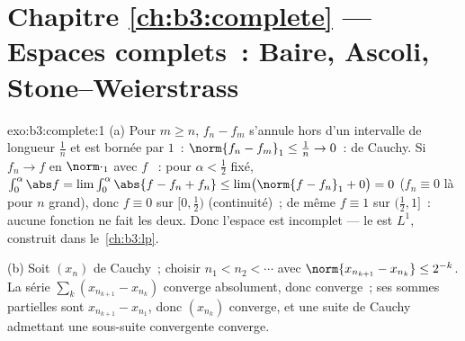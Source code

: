 \section*{Chapitre \ref{ch:b3:complete} --- Espaces complets~:
Baire, Ascoli, Stone--Weierstrass}

\begin{solution}{exo:b3:complete:1}
(a) Pour $m \geq n$, $f_n - f_m$ s'annule hors d'un intervalle
de longueur $\frac1n$ et est bornée par $1$~: $\norm{f_n -
f_m}_1 \leq \frac1n \to 0$~: de Cauchy. Si $f_n \to f$ en
$\norm\cdot_1$ avec $f$ ~: pour $\alpha < \frac12$
fixé, $\int_0^{\alpha}\abs f = \lim \int_0^\alpha\abs{f -
f_n + f_n} \leq \lim\bigl(\norm{f - f_n}_1 + 0\bigr) = 0$
($f_n \equiv 0$ là pour $n$ grand), donc $f \equiv 0$ sur
$[0, \frac12)$ (continuité)~; de même $f \equiv 1$ sur
$(\frac12, 1]$~: aucune fonction  ne fait les deux.
Donc l'espace est incomplet --- le  est $L^1$, construit
dans le~\cref{ch:b3:lp}.

(b) Soit $(x_n)$ de Cauchy~; choisir $n_1 < n_2 < \cdots$ avec
$\norm{x_{n_{k+1}} - x_{n_k}} \leq 2^{-k}$. La série
$\sum_k (x_{n_{k+1}} - x_{n_k})$ converge absolument, donc
converge~; ses sommes partielles sont $x_{n_{k+1}} - x_{n_1}$,
donc $(x_{n_k})$ converge, et une suite de Cauchy admettant
une sous-suite convergente converge.
\end{solution}

